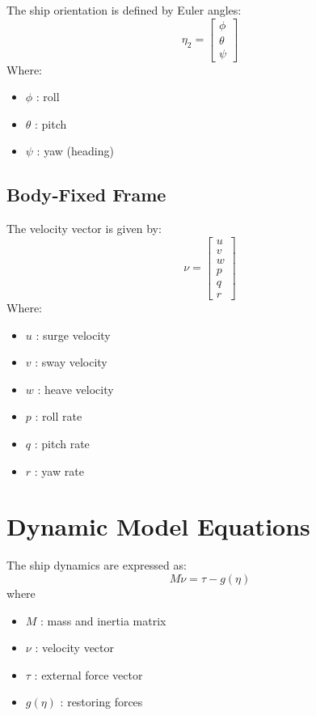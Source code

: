 \documentclass[12pt,a4paper]{report}
\begin{document}
The ship orientation is defined by Euler angles:
\begin{equation}
    \eta_2 = \begin{bmatrix} \phi \\ \theta \\ \psi \end{bmatrix}
\end{equation}
Where:
\begin{itemize}
    \item $\phi$ : roll
    \item $\theta$ : pitch
    \item $\psi$ : yaw (heading)
\end{itemize}

\section{Body‑Fixed Frame}
The velocity vector is given by:
\begin{equation}
    \nu = \begin{bmatrix} u \\ v \\ w \\ p \\ q \\ r \end{bmatrix}
\end{equation}
Where:
\begin{itemize}
    \item $u$ : surge velocity
    \item $v$ : sway velocity
    \item $w$ : heave velocity
    \item $p$ : roll rate
    \item $q$ : pitch rate
    \item $r$ : yaw rate
\end{itemize}

\chapter{Dynamic Model Equations}

The ship dynamics are expressed as:
\begin{equation}
    M\dot{\nu} = \tau - g(\eta)
\end{equation}
where
\begin{itemize}
    \item $M$ : mass and inertia matrix
    \item $\nu$ : velocity vector
    \item $\tau$ : external force vector
    \item $g(\eta)$ : restoring forces
\end{itemize}
\end{document}
